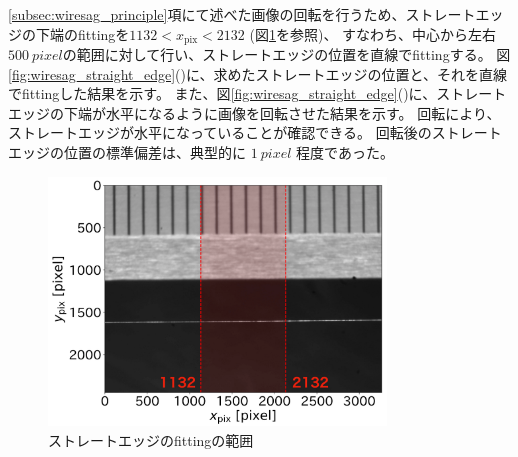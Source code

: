 \documentclass[../../main.tex]{subfiles}
\begin{document}
\ref{subsec:wiresag_principle}項にて述べた画像の回転を行うため、ストレートエッジの下端のfittingを$1132 < x_{\mathrm{pix}} < 2132$ (図\ref{fig:wiresag_edge_target_span}を参照)、
すなわち、中心から左右$\SI{500}{pixel}$の範囲に対して行い、ストレートエッジの位置を直線でfittingする。
図\ref{fig:wiresag_straight_edge}()に、求めたストレートエッジの位置と、それを直線でfittingした結果を示す。
また、図\ref{fig:wiresag_straight_edge}()に、ストレートエッジの下端が水平になるように画像を回転させた結果を示す。
回転により、ストレートエッジが水平になっていることが確認できる。
回転後のストレートエッジの位置の標準偏差は、典型的に $\SI{1}{pixel}$ 程度であった。
\begin{figure}[H]
    \centering
    \includegraphics[width=0.8\textwidth]{wiresag/wiresag_edge_target_span.pdf}
    \caption{ストレートエッジのfittingの範囲}
    \label{fig:wiresag_edge_target_span}
\end{figure}
\end{document}
